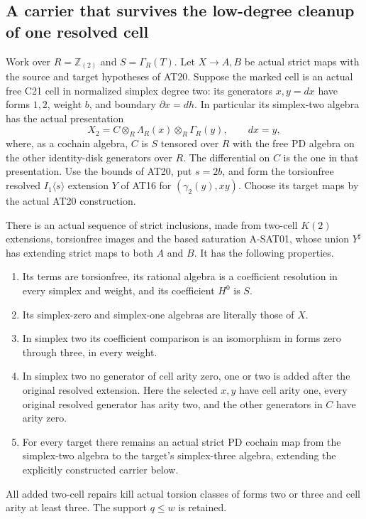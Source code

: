 \subsection{A carrier that survives the low-degree cleanup of one resolved cell}

\begin{theorem}
\label{AT24}
Work over $R=\mathbb Z_{(2)}$ and $S=\Gamma_R(T)$.
Let $X\to A,B$ be actual strict maps with the source and
target hypotheses of AT20. Suppose the marked cell is
an actual free C21 cell in normalized simplex degree two:
its generators $x,y=dx$ have forms $1,2$, weight $b$,
and boundary $\partial x=dh$.
In particular its simplex-two algebra has the actual
presentation
\[
 X_2=C\otimes_R\Lambda_R(x)\otimes_R\Gamma_R(y),
 \qquad dx=y,
 \tag{AT.157}
\]
where, as a cochain algebra, $C$ is $S$ tensored over
$R$ with the free PD algebra on the other identity-disk
generators over $R$.
The differential on $C$ is the one in that presentation.
Use the bounds of AT20, put $s=2b$, and form the
torsionfree resolved $I_1\langle s\rangle$ extension $Y$
of AT16 for $(\gamma_2(y),xy)$.
Choose its target maps by the actual AT20 construction.

There is an actual sequence of strict inclusions, made
from two-cell $K(2)$ extensions, torsionfree images and
the based saturation A-SAT01, whose union $Y^\sharp$
has extending strict maps to both $A$ and $B$.
It has the following properties.
\begin{enumerate}
\item Its terms are torsionfree, its rational algebra is
      a coefficient resolution in every simplex and
      weight, and its coefficient $H^0$ is $S$.
\item Its simplex-zero and simplex-one algebras are
      literally those of $X$.
\item In simplex two its coefficient comparison is
      an isomorphism in forms zero through three,
      in every weight.
\item In simplex two no generator of cell arity zero,
      one or two is added after the original resolved extension.
      Here the selected $x,y$ have cell arity one,
      every original resolved generator has arity two,
      and the other generators in $C$ have arity zero.
\item For every target there remains an actual strict
      PD cochain map from the simplex-two algebra to
      the target's simplex-three algebra, extending
      the explicitly constructed carrier below.
\end{enumerate}
All added two-cell repairs kill actual torsion classes
of forms two or three and cell arity at least three.
The support $q\leq w$ is retained.


\end{theorem}
